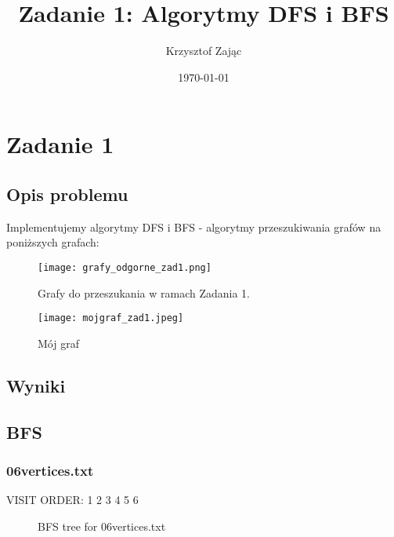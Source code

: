 \documentclass{article}
\title{Zadanie 1: Algorytmy DFS i BFS}
\author{Krzysztof Zając}
\date{\today}
\begin{document}
\maketitle

\section{Zadanie 1}
\subsection{Opis problemu}
Implementujemy algorytmy DFS i BFS - algorytmy przeszukiwania grafów na poniższych grafach:


\begin{figure}[H] 
    \centering
    \texttt{[image: grafy\_odgorne\_zad1.png]}
    \caption{Grafy do przeszukania w ramach Zadania 1.}
    \label{fig:grafy_zad1}
\end{figure}

\begin{figure}[H]
    \centering
    \texttt{[image: mojgraf\_zad1.jpeg]}
    \caption{Mój graf}
    \label{fig:graf_moj}
\end{figure}

\vspace{2cm}

\subsection{Wyniki}

\subsection{BFS}

\subsubsection{06vertices.txt}
VISIT ORDER: 1 2 3 4 5 6
\begin{figure}[H]
\centering
{}
\caption{BFS tree for 06vertices.txt}
\end{figure}
\end{document}
